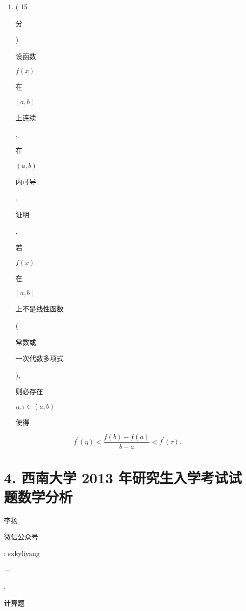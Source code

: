 \documentclass[10pt]{article}
\begin{document}
\begin{enumerate}
  \item ( 15 \begin{CJK}{UTF8}{mj}分\end{CJK}) \begin{CJK}{UTF8}{mj}设函数\end{CJK} $f(x)$ \begin{CJK}{UTF8}{mj}在\end{CJK} $[a, b]$ \begin{CJK}{UTF8}{mj}上连续\end{CJK}, \begin{CJK}{UTF8}{mj}在\end{CJK} $(a, b)$ \begin{CJK}{UTF8}{mj}内可导\end{CJK}. \begin{CJK}{UTF8}{mj}证明\end{CJK}. \begin{CJK}{UTF8}{mj}若\end{CJK} $f(x)$ \begin{CJK}{UTF8}{mj}在\end{CJK} $[a, b]$ \begin{CJK}{UTF8}{mj}上不是线性函数\end{CJK} (\begin{CJK}{UTF8}{mj}常数或\end{CJK} \begin{CJK}{UTF8}{mj}一次代数多项式\end{CJK}), \begin{CJK}{UTF8}{mj}则必存在\end{CJK} $\eta, \tau \in(a, b)$ \begin{CJK}{UTF8}{mj}使得\end{CJK}

\end{enumerate}
$$
f^{\prime}(\eta)<\frac{f(b)-f(a)}{b-a}<f^{\prime}(\tau) .
$$

\section{4. 西南大学 2013 年研究生入学考试试题数学分析}
\begin{CJK}{UTF8}{mj}李扬\end{CJK}

\begin{CJK}{UTF8}{mj}微信公众号\end{CJK}: sxkyliyang

\begin{CJK}{UTF8}{mj}一\end{CJK}. \begin{CJK}{UTF8}{mj}计算题\end{CJK}
\end{document}
